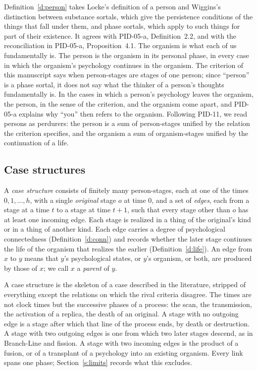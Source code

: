 \documentclass{situationist-preprint}
\begin{document}
Definition~\ref{d:person} takes Locke's definition of a person and Wiggins's distinction between substance sortals, which give the persistence conditions of the things that fall under them, and phase sortals, which apply to such things for part of their existence. It agrees with PID-05-a, Definition~2.2, and with the reconciliation in PID-05-a, Proposition~4.1. The organism is what each of us fundamentally is. The person is the organism in its personal phase, in every case in which the organism's psychology continues in the organism. The criterion of this manuscript says when person-stages are stages of one person; since \enquote{person} is a phase sortal, it does not say what the thinker of a person's thoughts fundamentally is. In the cases in which a person's psychology leaves the organism, the person, in the sense of the criterion, and the organism come apart, and PID-05-a explains why \enquote{you} then refers to the organism. Following PID-11, we read persons as perdurers: the person is a sum of person-stages unified by the relation the criterion specifies, and the organism a sum of organism-stages unified by the continuation of a life.

\subsection{Case structures}

\begin{definition}\label{d:case}
A \emph{case structure} consists of finitely many person-stages, each at one of the times $0, 1, \dots, h$, with a single \emph{original} stage $o$ at time $0$, and a set of \emph{edges}, each from a stage at a time $t$ to a stage at time $t+1$, such that every stage other than $o$ has at least one incoming edge. Each stage is realized in a thing of the original's kind or in a thing of another kind. Each edge carries a degree of psychological connectedness (Definition~\ref{d:conn}) and records whether the later stage continues the life of the organism that realizes the earlier (Definition~\ref{d:life}). An edge from $x$ to $y$ means that $y$'s psychological states, or $y$'s organism, or both, are produced by those of $x$; we call $x$ a \emph{parent} of $y$.
\end{definition}

A case structure is the skeleton of a case described in the literature, stripped of everything except the relations on which the rival criteria disagree. The times are not clock times but the successive phases of a process: the scan, the transmission, the activation of a replica, the death of an original. A stage with no outgoing edge is a stage after which that line of the process ends, by death or destruction. A stage with two outgoing edges is one from which two later stages descend, as in Branch-Line and fission. A stage with two incoming edges is the product of a fusion, or of a transplant of a psychology into an existing organism. Every link spans one phase; Section~\ref{s:limits} records what this excludes.
\end{document}

